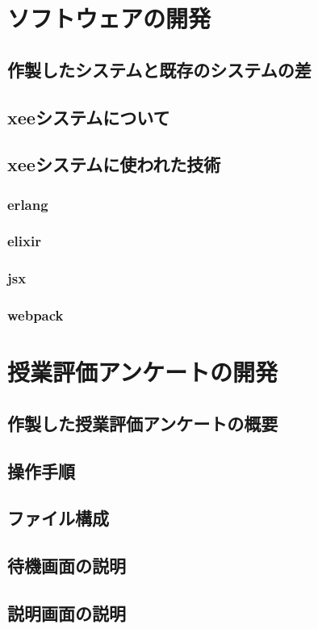 \documentclass[11pt,a4paper]{jsarticle}
\begin{document}
\section{ソフトウェアの開発}
\subsection{作製したシステムと既存のシステムの差}
\subsection{xeeシステムについて}
\subsection{xeeシステムに使われた技術}
\subsubsection{erlang}
\subsubsection{elixir}
\subsubsection{jsx}
\subsubsection{webpack}
\section{授業評価アンケートの開発}
\subsection{作製した授業評価アンケートの概要}
\subsection{操作手順}
\subsection{ファイル構成}
\subsection{待機画面の説明}
\subsection{説明画面の説明}
\end{document}
